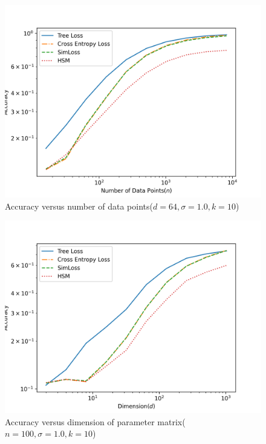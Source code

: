 \documentclass[twoside]{article}
\theoremstyle{definition}
\begin{document}
\begin{figure}[h]
\vspace{.3in}
\includegraphics[width=\linewidth]{fig/images/accuracy_vs_n.png}
\vspace{.3in}
\caption{\small Accuracy versus number of data points($d=64, \sigma=1.0, k=10$)}
\label{accuracy_vs_n}
\end{figure}

\begin{figure}[h]
\vspace{.3in}
\includegraphics[width=\linewidth]{fig/images/accuracy_vs_d.png}
\vspace{.3in}
\caption{\small Accuracy versus dimension of parameter matrix($n=100, \sigma=1.0, k=10$)}
\label{accuracy_vs_d}
\end{figure}
\end{document}
